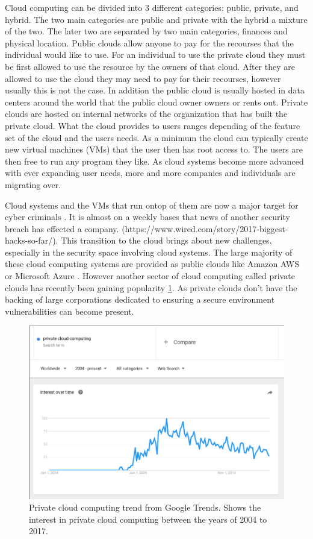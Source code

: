 \documentclass[12pt]{article}
\begin{document}
Cloud computing can be divided into 3 different categories: public, private, and hybrid.  The two main categories are public and private with the hybrid a mixture of the two. The later two are separated by two main categories, finances and physical location. Public clouds allow anyone to pay for the recourses that the individual would like to use. For an individual to use the private cloud they must be first allowed to use the resource by the owners of that cloud. After they are allowed to use the cloud they may need to pay for their recourses, however usually this is not the case.  In addition the public cloud is usually hosted in data centers around the world that the public cloud owner owners or rents out. Private clouds are hosted on internal networks of the organization that has built the private cloud.
What the cloud provides to users ranges depending of the feature set of the cloud and the users needs. As a minimum the cloud can typically create new virtual machines (VMs) that the user then has root access to. The users are then free to run any program they like. As cloud systems become more advanced with ever expanding user needs, more and more companies and individuals are migrating over.

Cloud systems and the VMs that run ontop of them are now a major target for cyber criminals \cite{kellerman}.
It is almost on a weekly bases that news of another security breach has effected a company. (https://www.wired.com/story/2017-biggest-hacks-so-far/). This transition to the cloud brings about new challenges, especially in the security space involving cloud systems. The large majority of these cloud computing systems are provided as public clouds like Amazon AWS \cite{amazonAWS} or Microsoft Azure \cite{Azure2017}. However another sector of cloud computing called private clouds has recently been gaining popularity \ref{fig:PrivCloudTrendGoogle}. As private clouds don't have the backing of large corporations dedicated to ensuring a secure environment vulnerabilities can become present.

\begin{figure}[ht]
    \centering
    \includegraphics[scale=.3]{./pic/2017-06-14-135222_914x619_scrot.png}
    \caption{Private cloud computing trend from Google Trends. Shows the interest in private cloud computing between the years of 2004 to 2017. \cite{GoogleTrendsPriv}}
    \label{fig:PrivCloudTrendGoogle}
\end{figure}
\end{document}
